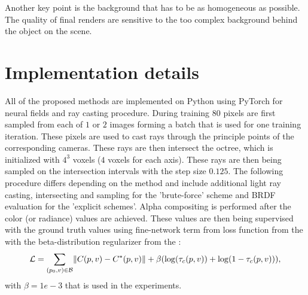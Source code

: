 Another key point is the background that has to be as homogeneous as possible.
The quality of final renders are sensitive to the too complex background behind the object on the scene.





\section{Implementation details}

All of the proposed methods are implemented on Python
using PyTorch for neural fields and ray casting procedure.
During training $80$ pixels are first sampled from each of $1$ or $2$ images 
forming a batch that is used for one training iteration.
These pixels are used to cast rays through the principle points of the corresponding cameras.
These rays are then intersect the octree, which is initialized with $4^3$ voxels ($4$ voxels for each axis).
These rays are then being sampled on the intersection intervals with the step size $0.125$.
The following procedure differs depending on the method
and include additional light ray casting, intersecting and sampling for the 'brute-force' scheme and BRDF evaluation for the 'explicit schemes'.
Alpha compositing is performed after the color (or radiance) values are achieved.
These values are then being supervised with the ground truth values using fine-network term from loss function from the  with the beta-distribution regularizer from the :
\begin{equation}
    \mathcal{L} = \sum_{(p_0,v)\in\mathcal{B}} \norm{ C(p, v) - C^*(p, v) } + \beta(\log(\tau_c(p, v)) + \log(1 - \tau_c(p, v))),
\end{equation}
with $\beta = 1e-3$ that is used in the experiments.

